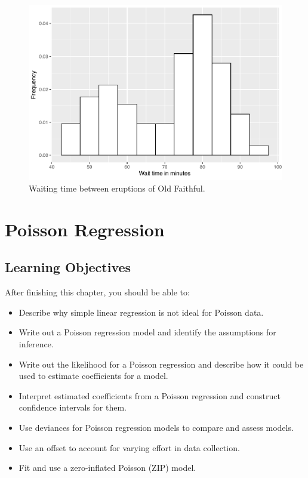 \documentclass[
]{krantz}
\providecommand{\tightlist}{%
  \setlength{\itemsep}{0pt}\setlength{\parskip}{0pt}}
\begin{document}
\begin{figure}

{\centering \includegraphics[width=0.6\linewidth]{bookdown-BeyondMLR_files/figure-latex/faithful-1} 

}

\caption{Waiting time between eruptions of Old Faithful.}\label{fig:faithful}
\end{figure}

\chapter{Poisson Regression}\label{ch-poissonreg}

\section{Learning Objectives}\label{learning-objectives-3}

After finishing this chapter, you should be able to:

\begin{itemize}
\tightlist
\item
  Describe why simple linear regression is not ideal for Poisson data.
\item
  Write out a Poisson regression model and identify the assumptions for inference.
\item
  Write out the likelihood for a Poisson regression and describe how it could be used to estimate coefficients for a model.
\item
  Interpret estimated coefficients from a Poisson regression and construct confidence intervals for them.
\item
  Use deviances for Poisson regression models to compare and assess models.
\item
  Use an offset to account for varying effort in data collection.
\item
  Fit and use a zero-inflated Poisson (ZIP) model.
\end{itemize}
\end{document}
